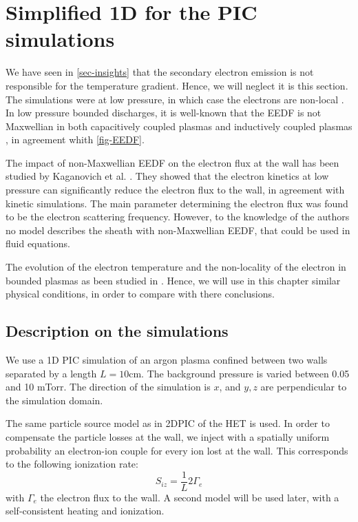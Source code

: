 


\section{Simplified 1D for the PIC simulations}
\label{sec-1DPIC}

We have seen in \cref{sec-insights} that the secondary electron emission is not responsible for the temperature gradient.
Hence, we will neglect it is this section.
The simulations were at low pressure, in which case  the electrons are non-local \cite{bernstein1954, godyak1993}.
In low pressure bounded discharges, it is well-known that the EEDF is not Maxwellian in both capacitively coupled plasmas and inductively coupled plasmas \cite{mouchtouris2016, godyak2002, meige2006a, dominguez-vazquez2018}, in agreement whith \vref{fig-EEDF}.

The impact of non-Maxwellian EEDF on the electron flux at the wall has been studied by Kaganovich et al. \citep{kaganovich2000,kaganovich2007}.
They showed that the electron kinetics at low pressure can significantly reduce the electron flux to the wall, in agreement with kinetic simulations.
The main parameter determining the electron flux was found to be the electron scattering frequency.
However, to the knowledge of the authors no model describes the sheath with non-Maxwellian EEDF, that could be used in fluid equations.

The evolution of the electron temperature and the non-locality of the electron in bounded plasmas as been studied in \citet{meige2006a}.
Hence, we will use in this chapter similar physical conditions, in order to compare with there conclusions.

\subsection{Description on the simulations}

We use a 1D PIC simulation of an argon plasma confined between two walls separated by a length $L=10$cm.
The background pressure is varied between 0.05 and 10 mTorr.
The direction of the simulation is $x$, and $y,z$ are perpendicular to the simulation domain.

The same particle source model as in \ac{2D}\ac{PIC} of the \ac{HET} is used.
In order to compensate the particle losses at the wall, we inject with a spatially uniform probability an electron-ion couple for every ion lost at the wall.
This corresponds to the following ionization rate:
\begin{equation}
  S_{iz} = \frac{1}{L} 2 \Gamma_e
\end{equation}
with $\Gamma_e$ the electron flux to the wall.
A second model will be used later, with a self-consistent heating and ionization.


